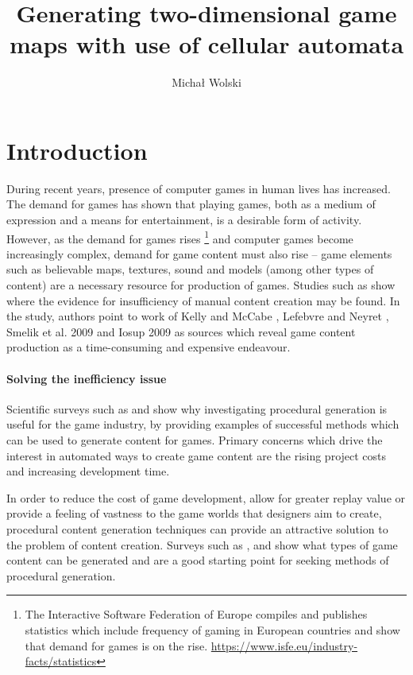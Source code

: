 \documentclass[12pt]{report}
\title{Generating two-dimensional game maps with use of cellular automata}
\author{Michał Wolski}
\begin{document}
\maketitle
\tableofcontents 



\chapter{Introduction} \label{rozdzial.wstep} 
During recent years, presence of computer games in human lives has increased. The demand for games has shown that playing games, both as a medium of expression and a means for entertainment, is a desirable form of activity. However, as the demand for games rises \footnote{The Interactive Software Federation of Europe compiles and publishes statistics which include frequency of gaming in European countries and show that demand for games is on the rise. \url{https://www.isfe.eu/industry-facts/statistics}} and computer games become increasingly complex, demand for game content must also rise -- game elements such as believable maps, textures, sound and models (among other types of content) are a necessary resource for production of games. Studies such as \autocite{hendrikx2013procedural} show where the evidence for insufficiency of manual content creation may be found. In the study, authors point to work of Kelly and McCabe \autocite{kelly2007citygen}, Lefebvre and Neyret \autocite{lefebvre2003pattern}, Smelik et al. 2009 \autocite{smelik2009survey} and Iosup 2009 \autocite{iosup2009poggi} as sources which reveal game content production as a time-consuming and expensive endeavour.

\subsubsection{Solving the inefficiency issue}
Scientific surveys such as \autocite{hendrikx2013procedural} and \autocite{smelik2009survey} show why investigating procedural generation is useful for the game industry, by providing examples of successful methods which can be used to generate content for games. Primary concerns which drive the interest in automated ways to create game content are the rising project costs and increasing development time.

In order to reduce the cost of game development, allow for greater replay value or provide a feeling of vastness to the game worlds that designers aim to create, procedural content generation techniques can provide an attractive solution to the problem of content creation. Surveys such as \autocite{hendrikx2013procedural}, \autocite{togelius2011search} and \autocite{de2011survey} show what types of game content can be generated and are a good starting point for seeking methods of procedural generation.
\end{document}
